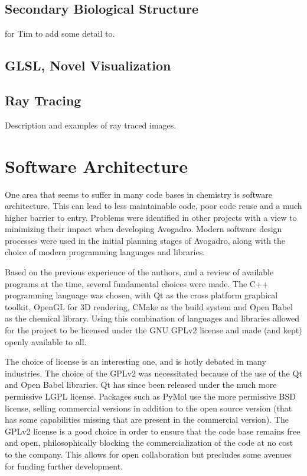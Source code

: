 \documentclass[10pt]{bmc_article}
\newenvironment{bmcformat}{\begin{raggedright}
\baselineskip20pt\sloppy\setboolean{publ}{false}}{\end{raggedright}
\baselineskip20pt\sloppy}
\begin{document}
\begin{bmcformat}
\subsection{Secondary Biological Structure} %
for Tim to add some detail to.

\subsection{GLSL, Novel Visualization}



\subsection{Ray Tracing}

Description and examples of ray traced images.

\section{Software Architecture}

One area that seems to suffer in many code bases in chemistry is software
architecture. This can lead to less maintainable code, poor code reuse and a
much higher barrier to entry. Problems were identified in other projects with a
view to minimizing their impact when developing Avogadro. Modern software design
processes were used in the initial planning stages of Avogadro, along with the
choice of modern programming languages and libraries.

Based on the previous experience of the authors, and a review of available
programs at the time, several fundamental choices were made. The C++ programming
language was chosen, with Qt as the cross platform graphical toolkit, OpenGL for
3D rendering, CMake as the build system and Open Babel as the chemical library.
Using this combination of languages and libraries allowed for the project to be
licensed under the GNU GPLv2 license and made (and kept) openly available to
all.

The choice of license is an interesting one, and is hotly debated in many
industries. The choice of the GPLv2 was necessitated because of the use of the
Qt and Open Babel libraries. Qt has since been released under the much more
permissive LGPL license. Packages such as PyMol use the more permissive BSD
license, selling commercial versions in addition to the open source version
(that has some capabilities missing that are present in the commercial version).
The GPLv2 license is a good choice in order to ensure that the code base remains
free and open, philosophically blocking the commercialization of the code at no
cost to the company. This allows for open collaboration but precludes some
avenues for funding further development.


\end{bmcformat}
\end{document}
